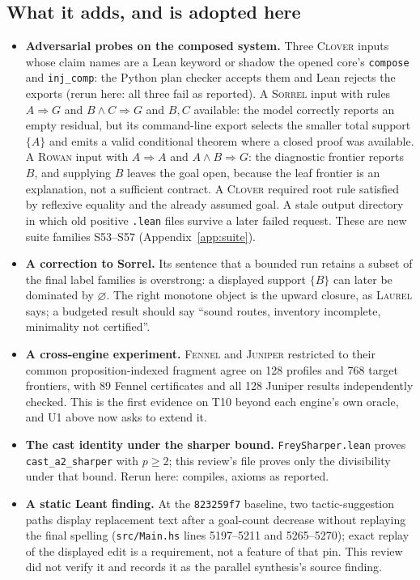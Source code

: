 \documentclass[11pt,a4paper]{article}
\newcommand{\code}[1]{\nolinkurl{#1}}
\newcommand{\Cl}{\textsc{Clover}}
\newcommand{\Fe}{\textsc{Fennel}}
\newcommand{\Ju}{\textsc{Juniper}}
\newcommand{\La}{\textsc{Laurel}}
\newcommand{\Ro}{\textsc{Rowan}}
\newcommand{\So}{\textsc{Sorrel}}
\theoremstyle{definition}
\theoremstyle{plain}
\begin{document}
\subsection{What it adds, and is adopted here}
\begin{itemize}
\item \textbf{Adversarial probes on the composed system.} Three \Cl{} inputs whose claim names are a Lean keyword or shadow the opened core's \code{compose} and \code{inj_comp}: the Python plan checker accepts them and Lean rejects the exports (rerun here: all three fail as reported). A \So{} input with rules $A\Rightarrow G$ and $B\wedge C\Rightarrow G$ and $B,C$ available: the model correctly reports an empty residual, but its command-line export selects the smaller total support $\{A\}$ and emits a valid conditional theorem where a closed proof was available. A \Ro{} input with $A\Rightarrow A$ and $A\wedge B\Rightarrow G$: the diagnostic frontier reports $B$, and supplying $B$ leaves the goal open, because the leaf frontier is an explanation, not a sufficient contract. A \Cl{} required root rule satisfied by reflexive equality and the already assumed goal. A stale output directory in which old positive \code{.lean} files survive a later failed request. These are new suite families S53--S57 (Appendix~\ref{app:suite}).
\item \textbf{A correction to Sorrel.} Its sentence that a bounded run retains a subset of the final label families is overstrong: a displayed support $\{B\}$ can later be dominated by $\varnothing$. The right monotone object is the upward closure, as \La{} says; a budgeted result should say ``sound routes, inventory incomplete, minimality not certified''.
\item \textbf{A cross-engine experiment.} \Fe{} and \Ju{} restricted to their common proposition-indexed fragment agree on 128 profiles and 768 target frontiers, with 89 Fennel certificates and all 128 Juniper results independently checked. This is the first evidence on T10 beyond each engine's own oracle, and U1 above now asks to extend it.
\item \textbf{The cast identity under the sharper bound.} \code{FreySharper.lean} proves \code{cast_a2_sharper} with $p\ge2$; this review's file proves only the divisibility under that bound. Rerun here: compiles, axioms as reported.
\item \textbf{A static Leant finding.} At the \code{823259f7} baseline, two tactic-suggestion paths display replacement text after a goal-count decrease without replaying the final spelling (\code{src/Main.hs} lines 5197--5211 and 5265--5270); exact replay of the displayed edit is a requirement, not a feature of that pin. This review did not verify it and records it as the parallel synthesis's source finding.

\end{itemize}
\end{document}
